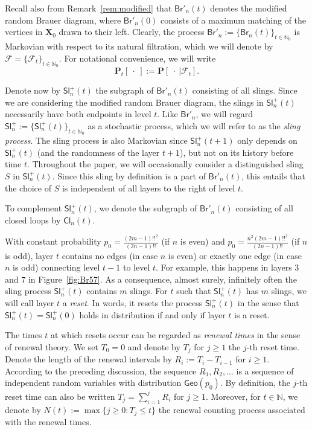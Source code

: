 \documentclass[a4paper,11pt,reqno]{amsart}
\newcommand{\paul}[1]{\todo[color=yellow!70,inline]{Paul: #1}}
\newcommand{\fabian}[1]{\todo[color=red!50,inline]{Fabian: #1}}
\newcommand{\IN}{\mathbb{N}}
\newcommand{\bP}{\mathbf{P}}
\newcommand{\Br}{\mathsf{Br}}
\newcommand{\Slr}{\mathsf{Sl}^+}
\newcommand{\Cl}{\mathsf{Cl}}
\newcommand{\Geo}{\mathsf{Geo}}
\newcommand{\F}{\mathscr{F}}
\newcommand{\mb}{\mathbf}
\theoremstyle{definition}
\begin{document}
Recall also from Remark~\ref{rem:modified} that $\Br'_n(t)$ denotes the modified random Brauer diagram, where $\Br'_n(0)$ consists of a maximum matching of the vertices in $\mb X_0$ drawn to their left. Clearly, the process $\Br'_n:=\{\Br_n(t)\}_{t\in\IN_0}$ is Markovian with respect to its natural filtration, which we will denote by $\F=\{\F_t\}_{t\in\IN_0}$. For notational convenience, we will write 
\[
 \bP_t[\ \cdot\ ] := \bP[\ \cdot\ | \F_t].
\] 


Denote now by $\Slr_n(t)$ the subgraph of $\Br'_n(t)$ consisting of all slings. Since we are considering the modified random Brauer diagram, the slings in $\Slr_n(t)$ necessarily have both endpoints in level $t$. Like $\Br'_n$, we will regard $\Slr_n:=\{\Slr_n(t)\}_{t\in\IN_0}$ as a stochastic process, which we will refer to as the \emph{sling process}. The sling process is also Markovian since $\Slr_n(t+1)$ only depends on $\Slr_n(t)$ (and the randomness of the layer $t+1$), but not on its history before time $t$. Throughout the paper, we will occasionally consider a distinguished sling $S$ in $\Slr_n(t)$. Since this sling by definition is a part of $\Br'_n(t)$, this entails that the choice of $S$ is independent of all layers to the right of level $t$.  

To complement $\Slr_n(t)$, we denote the subgraph of $\Br'_n(t)$ consisting of all closed loops by $\Cl_n(t)$.

With constant probability $p_0=\frac{(2m-1)!!^2}{(2n-1)!!}$ (if $n$ is even) and $p_0=\frac{n^2(2m-1)!!^2}{(2n-1)!!}$ (if $n$ is odd), layer $t$ contains no edges (in case $n$ is even) or exactly one edge (in case $n$ is odd) connecting level $t-1$ to level $t$. For example, this happens in layers $3$ and $7$ in Figure~\ref{fig:Br57}. As a consequence, almost surely, infinitely often the sling process $\Slr_n(t)$ contains $m$ slings. For $t$ such that $\Slr_n(t)$ has $m$ slings, we will call layer $t$ a \emph{reset}. In words, it resets the process $\Slr_n(t)$ in the sense that $\Slr_n(t)=\Slr_n(0)$ holds in distribution if and only if layer $t$ is a reset. 

The times $t$ at which resets occur can be regarded as \emph{renewal times} in the sense of renewal theory. We set $T_0=0$ and denote by $T_j$ for $j\geq 1$ the $j$-th reset time. Denote the length of the renewal intervals by $R_i:=T_i-T_{i-1}$ for $i\geq 1$. According to the preceding discussion, the sequence $R_1,R_2,\dots$ is a sequence of independent random variables with distribution $\Geo(p_0)$. By definition, the $j$-th reset time can also be written $T_j=\sum_{i=1}^j R_i$ for $j\geq 1$. Moreover, for $t\in\IN$, we denote by $N(t):=\max\{j\geq 0:T_j\leq t\}$ the renewal counting process associated with the renewal times.
\end{document}
